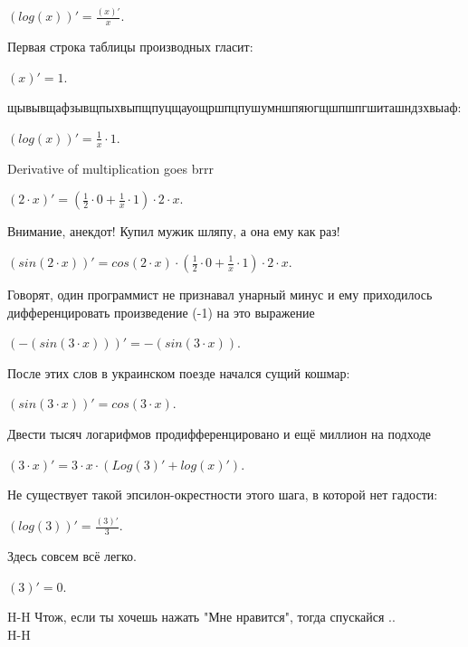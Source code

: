 \documentclass{article}
\begin{document}
\begin{center}$(log(x))'= \frac { (x)'} {x}$.\end{center}
Первая строка таблицы производных гласит:\\
\begin{center}$(x)' = 1$.\end{center}
щывывщафзывщпыхвыпщпуцщауощршпцпушумншпяюгщшпшпгшиташндзхвыаф:\\
\begin{center}$(log(x))'=  \frac {1} {{x}} \cdot {1}$.\end{center}
Derivative of multiplication goes brrr\\
\begin{center}$({2} \cdot x)'= ( \frac {1} {{{2}}} \cdot {0}+ \frac {1} {{x}} \cdot {1}) \cdot {2} \cdot x$.\end{center}
Внимание, анекдот! Купил мужик шляпу, а она ему как раз!\\
\begin{center}$(sin({2} \cdot x))'= cos({2} \cdot x) \cdot ( \frac {1} {{{2}}} \cdot {0}+ \frac {1} {{x}} \cdot {1}) \cdot {2} \cdot x$.\end{center}
Говорят, один программист не признавал унарный минус и ему приходилось дифференцировать произведение (-1) на это выражение\\
\begin{center}$(-(sin({3} \cdot x)))'= -(sin({3} \cdot x))$.\end{center}
После этих слов в украинском поезде начался сущий кошмар:\\
\begin{center}$(sin({3} \cdot x))'= cos({3} \cdot x)$.\end{center}
Двести тысяч логарифмов продифференцировано и ещё миллион на подходе\\
\begin{center}$({3} \cdot x)'={3} \cdot x\cdot (Log({3})' + log(x)')$.\end{center}
Не существует такой эпсилон-окрестности этого шага, в которой нет гадости:\\
\begin{center}$(log({3}))'= \frac { ({3})'} {{3}}$.\end{center}
Здесь совсем всё легко.\\
\begin{center}$({3})' = 0$.\end{center}
H-H Чтож, если ты хочешь нажать "Мне нравится", тогда спускайся ..\\
H-H\\
\end{document}

